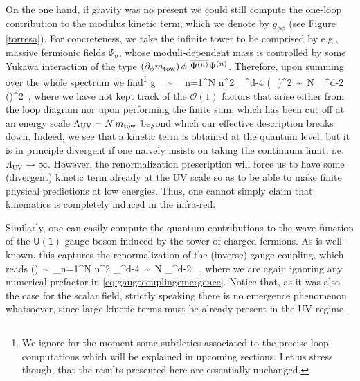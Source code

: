 On the one hand, if gravity was no present we could still compute the one-loop contribution to the modulus kinetic term, which we denote by $g_{\phi\phi}$ (see Figure \ref{torresa}). For concreteness, we take the infinite tower to be comprised by e.g., massive fermionic fields $\Psi_n$, whose moduli-dependent mass is controlled by some Yukawa interaction of the type $(\partial_\phi \Mt)\, \phi \ \overline{\Psi^{(n)}} \Psi^{(n)}$. Therefore, upon summing over the whole spectrum we find\footnote{We ignore for the moment some subtleties associated to the precise loop computations which will be explained in upcoming sections. Let us stress though, that the results presented here are essentially unchanged.}
%
\beq \label{eq:metricemergence}
	\delta g_{\phi\phi}\, \sim\, \sum_{n=1}^N n^2 \Lambda_{}^{d-4}  (\partial_\phi \Mt)^2\, \sim\, N \Lambda_{}^{d-2} \left(\frac {\partial_\phi \Mt}{\Mt}\right)^2\, ,
\eeq
%
where we have not kept track of the $\mathcal{O}(1)$ factors that arise either from the loop diagram nor upon performing the finite sum, which has been cut off at an energy scale $\Lambda_{\text{UV}} = N\, m_{\text{tow}}$ beyond which our effective description breaks down. Indeed, we see that a kinetic term is obtained at the quantum level, but it is in principle divergent if one naively insists on taking the continuum limit, i.e. $\Lambda_{\text{UV}} \to \infty$. However, the renormalization prescription will force us to have some (divergent) kinetic term already at the UV scale so as to be able to make finite  physical predictions at low energies. Thus, one cannot simply claim that kinematics is completely induced in the infra-red. 

Similarly, one can easily compute the quantum contributions to the wave-function of the $\mathsf{U(1)}$ gauge boson induced by the tower of charged fermions. As is well-known, this captures the renormalization of the (inverse) gauge coupling, which reads
%
\beq
	\delta \left(\right)\, \sim\,  \sum_{n=1}^N n^2 \Lambda_{}^{d-4}\, \sim\, N \Lambda_{}^{d-2} \, ,
	\label{eq:gaugecouplingemergence}
\eeq
%
where we are again ignoring any numerical prefactor in \eqref{eq:gaugecouplingemergence}. Notice that, as it was also the case for the scalar field, strictly speaking there is no emergence phenomenon whatsoever, since large kinetic terms must be already present in the UV regime.  


